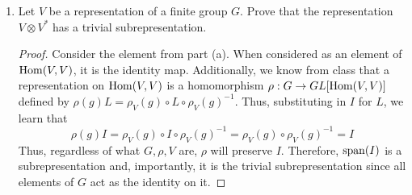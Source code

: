 \documentclass[../psets.tex]{subfiles}
\begin{document}
\begin{enumerate}
\begin{enumerate}
\begin{proof}
\begin{equation*}
                Pv = 0
            \end{equation*}
            Thus, the restriction $P_2$ of $P$ to $\ker(P)$ is equal to the zero map on $\ker(P)$.\par
            Since $V=\im(P)\oplus\ker(P)$, $P=P_1\oplus P_2$. In particular, there will exist an orthonormal basis in which the first $k$ vectors form a basis of $\im(P)$ and the next $n-k$ vectors form a basis of $\ker(P)$. Thus, $\dim(\im(P))=k$. Moreover, with respect to this basis, the $n\times n$ matrix of $P$ will have a $k\times k$ block in the upper left-hand corner in which $I_k$ resides, and it will be zeroes everywhere else. Since the trace is invariant under similarity transformations, it can be read off from this matrix as $k$ as well.
        \end{proof}
        \item Let $V$ be a representation of a finite group $G$. Prove that the representation $V\otimes V^*$ has a trivial subrepresentation.
        \begin{proof}
            Consider the element from part (a). When considered as an element of $\operatorname{Hom}(V,V)$, it is the identity map. Additionally, we know from class that a representation on $\operatorname{Hom}(V,V)$ is a homomorphism $\rho:G\to GL[\operatorname{Hom}(V,V)]$ defined by $\rho(g)L=\rho_V(g)\circ L\circ\rho_V(g)^{-1}$. Thus, substituting in $I$ for $L$, we learn that
            \begin{equation*}
                \rho(g)I = \rho_V(g)\circ I\circ\rho_V(g)^{-1}
                = \rho_V(g)\circ\rho_V(g)^{-1}
                = I
            \end{equation*}
            Thus, regardless of what $G,\rho,V$ are, $\rho$ will preserve $I$. Therefore, $\operatorname{span}(I)$ is a subrepresentation and, importantly, it is the trivial subrepresentation since all elements of $G$ act as the identity on it.
        \end{proof}
    \end{enumerate}
\end{enumerate}
\end{document}
